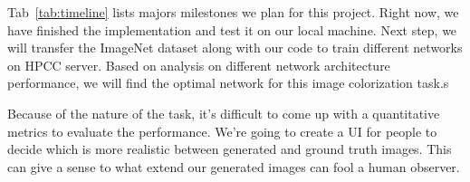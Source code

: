 \documentclass[10pt,twocolumn,letterpaper]{article}
\begin{document}
Tab~\ref{tab:timeline} lists majors milestones we plan for this project. Right now, we have finished the implementation and test it on our local machine. Next step, we will transfer the ImageNet dataset along with our code to train different networks on HPCC server. Based on analysis on different network architecture performance, we will find the optimal network for this image colorization task.s

Because of the nature of the task, it's difficult to come up with a quantitative metrics to evaluate the performance. We're going to create a UI for people to decide which is more realistic between generated and ground truth images. This can give a sense to what extend our generated images can fool a human observer.



{\small


}
\end{document}
